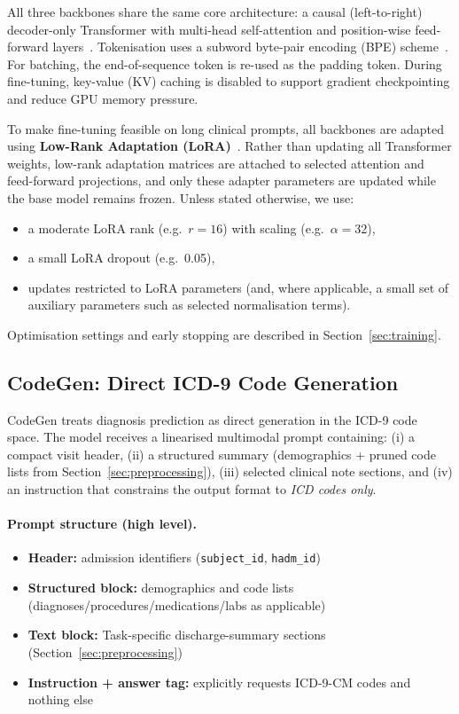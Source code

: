 All three backbones share the same core architecture: a causal (left-to-right) decoder-only Transformer with multi-head self-attention and position-wise feed-forward layers~\cite{vaswani2017attention,touvron2023llama}. Tokenisation uses a subword byte-pair encoding (BPE) scheme~\cite{sennrich2016neural}. For batching, the end-of-sequence token is re-used as the padding token. During fine-tuning, key-value (KV) caching is disabled to support gradient checkpointing and reduce GPU memory pressure.

To make fine-tuning feasible on long clinical prompts, all backbones are adapted using \textbf{Low-Rank Adaptation (LoRA)}~\cite{hu2021lora}. Rather than updating all Transformer weights, low-rank adaptation matrices are attached to selected attention and feed-forward projections, and only these adapter parameters are updated while the base model remains frozen. Unless stated otherwise, we use:
\begin{itemize}
    \item a moderate LoRA rank (e.g.\ $r=16$) with scaling (e.g.\ $\alpha=32$),
    \item a small LoRA dropout (e.g.\ 0.05),
    \item updates restricted to LoRA parameters (and, where applicable, a small set of auxiliary parameters such as selected normalisation terms).
\end{itemize}

Optimisation settings and early stopping are described in Section~\ref{sec:training}.

\subsection{CodeGen: Direct ICD-9 Code Generation}
\label{subsec:codegen-arch}

CodeGen treats diagnosis prediction as direct generation in the ICD-9 code space. The model receives a linearised multimodal prompt containing:
(i) a compact visit header,
(ii) a structured summary (demographics + pruned code lists from Section~\ref{sec:preprocessing}),
(iii) selected clinical note sections, and
(iv) an instruction that constrains the output format to \emph{ICD codes only}.

\paragraph{Prompt structure (high level).}
\begin{itemize}
    \item \textbf{Header:} admission identifiers (\texttt{subject\_id}, \texttt{hadm\_id})
    \item \textbf{Structured block:} demographics and code lists (diagnoses/procedures/medications/labs as applicable)
    \item \textbf{Text block:} Task-specific discharge-summary sections (Section~\ref{sec:preprocessing})
    \item \textbf{Instruction + answer tag:} explicitly requests ICD-9-CM codes and nothing else
\end{itemize}

